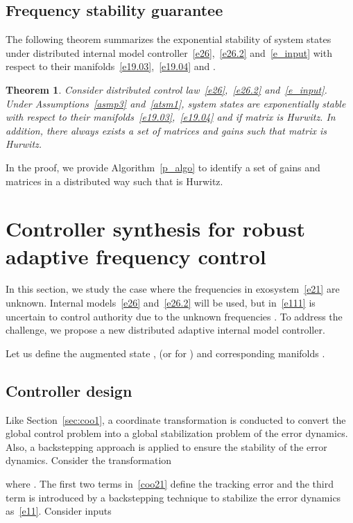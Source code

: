 \documentclass[journal]{IEEEtran}
\newtheorem{theorem}{\bf Theorem}[section]
\begin{document}
\subsection{Frequency stability guarantee}\label{sec:stab1}
The following theorem summarizes the exponential stability of system states  under distributed internal model controller~\eqref{e26},~\eqref{e26.2} and~\eqref{e_input} with respect to their manifolds~\eqref{e19.03},~\eqref{e19.04} and .
\begin{theorem}
Consider distributed control law~\eqref{e26},~\eqref{e26.2} and~\eqref{e_input}. Under Assumptions~\ref{asmp3} and~\ref{atsm1}, system states  are exponentially stable with respect to their manifolds~\eqref{e19.03},~\eqref{e19.04} and  if matrix  is Hurwitz. In addition, there always exists a set of matrices  and gains  such that matrix  is Hurwitz.
\label{attheo1}
\end{theorem}

In the proof, we provide Algorithm~\ref{p_algo} to identify a set of gains and matrices in a distributed way such that  is Hurwitz.

\section{Controller synthesis for robust adaptive frequency control}\label{sec:sol2}
In this section, we study the case where the frequencies  in exosystem~\eqref{e21} are unknown.
Internal models~\eqref{e26} and~\eqref{e26.2} will be used, but  in~\eqref{e111} is uncertain to control authority  due to the unknown frequencies .
To address the challenge, we propose a new distributed adaptive internal model controller.

Let us define the augmented state ,  (or  for ) and corresponding manifolds .





\subsection{Controller design}\label{sec:coo2}
Like Section~\ref{sec:coo1}, a coordinate transformation is conducted to convert the global control problem into a global stabilization problem of the error dynamics.
Also, a backstepping approach is applied to ensure the stability of the error dynamics.
Consider the transformation

where .
The first two terms in~\eqref{coo21} define the tracking error and the third term is introduced by a backstepping technique to stabilize the error dynamics as~\eqref{e11}.
Consider inputs
\end{document}
